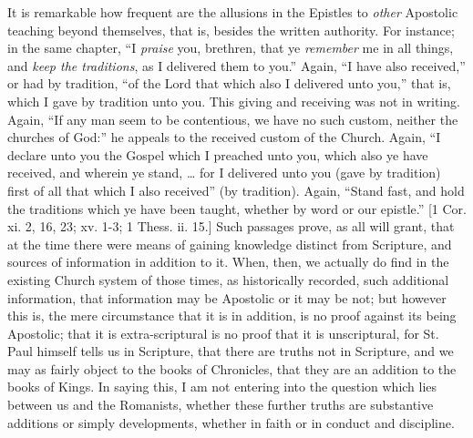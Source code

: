 It is remarkable how frequent are the allusions in the Epistles to \emph{other}
Apostolic teaching beyond themselves, that is, besides the written
authority. For instance; in the same chapter, ``I \emph{praise}
you, brethren, that ye \emph{remember} me in all things, and \emph{keep
the traditions}, as I delivered them to you.'' Again, ``I
have also received,'' or had by tradition, ``of the Lord that
which also I delivered unto you,'' that is, which I gave by
tradition unto you. This giving and receiving was not in writing.
Again, ``If any man seem to be contentious, we have no such
custom, neither the churches of God:'' he appeals to the received
custom of the Church. Again, ``I declare unto you the Gospel which
I preached unto you, which also ye have received, and wherein ye
stand, … for I delivered unto you (gave by tradition) first of all
that which I also received'' (by tradition). Again, ``Stand
fast, and hold the traditions which ye have been taught, whether by
word or our epistle.'' [1 Cor. xi. 2, 16, 23; xv. 1-3; 1 Thess.
ii. 15.] Such passages prove, as all will grant, that at the time
there were means of gaining knowledge distinct from Scripture, and
sources of information in addition to it. When, then, we actually do
find in the existing Church system of those times, as historically
recorded, such additional information, that information may be
Apostolic or it may be not; but however this is, the mere circumstance
that it is in addition, is no proof against its being Apostolic; that
it is extra-scriptural is no proof that it is unscriptural, for St.
Paul himself tells us in Scripture, that there are truths not in
Scripture, and we may as fairly object to the books of Chronicles,
that they are an addition to the books of Kings. In saying this,
I am not entering into the question which lies between us and the
Romanists, whether these further truths are substantive additions or
simply developments, whether in faith or in conduct and discipline.

